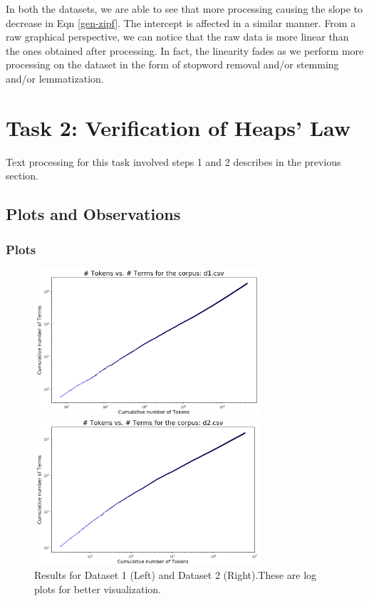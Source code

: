 \documentclass{article}
\begin{document}
\begin{flushleft}
In both the datasets, we are able to see that more processing causing the slope to decrease in Eqn \ref{gen-zipf}. The intercept is affected in a similar manner. From a raw graphical perspective, we can notice that the raw data is more linear than the ones obtained after processing. In fact, the linearity fades as we perform more processing on the dataset in the form of stopword removal and/or stemming and/or lemmatization.
\end{flushleft}

\section{Task 2: Verification of Heaps' Law}
Text processing for this task involved steps 1 and 2 describes in the previous section.
\subsection{Plots and Observations}
\subsubsection{Plots}
\begin{flushleft}
\begin{figure}[H]
\begin{minipage}{0.45\linewidth}
\centering
\includegraphics[width=0.75\textwidth]{./images/dataset-1-t2-0.png}
\end{minipage}
\hfill
\begin{minipage}{0.45\linewidth}
\centering
\includegraphics[width=0.75\textwidth]{./images/dataset-2-t2-0.png}
\end{minipage}
\caption{Results for Dataset 1 (Left) and Dataset 2 (Right).\newline{}These are log plots for better visualization.}
\end{figure}
\end{flushleft}
\end{document}
